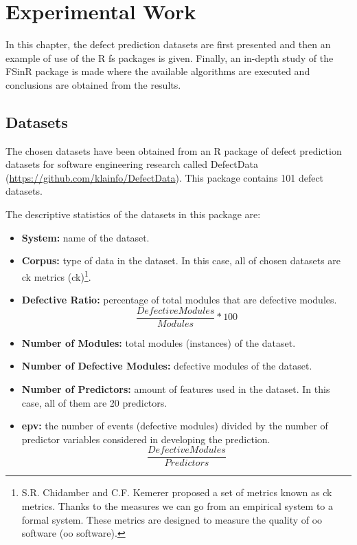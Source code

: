 \chapter{Experimental Work}
\label{cha:experimental-work}

In this chapter, the defect prediction datasets are first presented and then an example of use of the R \acrlong{fs} packages is given. Finally, an in-depth study of the FSinR package is made where the available algorithms are executed and conclusions are obtained from the results.

\section{Datasets}
\label{sec:datasets}

The chosen datasets have been obtained from an R package of defect prediction datasets for software engineering research called DefectData (\url{https://github.com/klainfo/DefectData}). This package contains 101 defect datasets.

The descriptive statistics of the datasets in this package are:
\begin{itemize}
    \item \textbf{System:} name of the dataset.
    
    \item \textbf{Corpus:} type of data in the dataset. In this case, all of chosen datasets are \acrlong{ck} metrics (\acrshort{ck})\footnote{S.R. Chidamber and C.F. Kemerer proposed a set of metrics known as \acrshort{ck} metrics. Thanks to the measures we can go from an empirical system to a formal system. These metrics are designed to measure the quality of \acrlong{oo} software (\acrshort{oo} software).}.
    
    \item \textbf{Defective Ratio:} percentage of total modules that are defective modules.
        \[\frac{DefectiveModules}{Modules} * 100\]
    
    \item \textbf{Number of Modules:} total modules (instances) of the dataset.
    
    \item \textbf{Number of Defective Modules:} defective modules of the dataset.
    
    \item \textbf{Number of Predictors:} amount of features used in the dataset. In this case, all of them are 20 predictors.
    
    \item \textbf{\acrfull{epv}:} the number of events (defective modules) divided by the number of predictor variables considered in developing the prediction.
        \[\frac{DefectiveModules}{Predictors}\]
\end{itemize}

